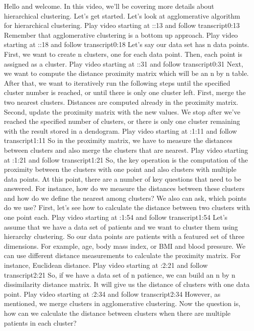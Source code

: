 Hello and welcome. In this video, we'll be covering more details about hierarchical clustering. Let's get started. Let's look at agglomerative algorithm for hierarchical clustering.
Play video starting at ::13 and follow transcript0:13
Remember that agglomerative clustering is a bottom up approach.
Play video starting at ::18 and follow transcript0:18
Let's say our data set has n data points. First, we want to create n clusters, one for each data point. Then, each point is assigned as a cluster.
Play video starting at ::31 and follow transcript0:31
Next, we want to compute the distance proximity matrix which will be an n by n table. After that, we want to iteratively run the following steps until the specified cluster number is reached, or until there is only one cluster left. First, merge the two nearest clusters. Distances are computed already in the proximity matrix. Second, update the proximity matrix with the new values. We stop after we've reached the specified number of clusters, or there is only one cluster remaining with the result stored in a dendogram.
Play video starting at :1:11 and follow transcript1:11
So in the proximity matrix, we have to measure the distances between clusters and also merge the clusters that are nearest.
Play video starting at :1:21 and follow transcript1:21
So, the key operation is the computation of the proximity between the clusters with one point and also clusters with multiple data points. At this point, there are a number of key questions that need to be answered. For instance, how do we measure the distances between these clusters and how do we define the nearest among clusters? We also can ask, which points do we use? First, let's see how to calculate the distance between two clusters with one point each.
Play video starting at :1:54 and follow transcript1:54
Let's assume that we have a data set of patients and we want to cluster them using hierarchy clustering. So our data points are patients with a featured set of three dimensions. For example, age, body mass index, or BMI and blood pressure. We can use different distance measurements to calculate the proximity matrix. For instance, Euclidean distance.
Play video starting at :2:21 and follow transcript2:21
So, if we have a data set of n patience, we can build an n by n dissimilarity distance matrix. It will give us the distance of clusters with one data point.
Play video starting at :2:34 and follow transcript2:34
However, as mentioned, we merge clusters in agglomerative clustering. Now the question is, how can we calculate the distance between clusters when there are multiple patients in each cluster?
